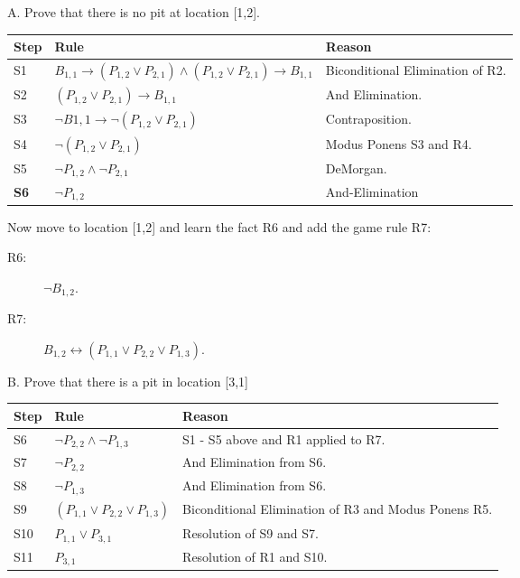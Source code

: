 \documentclass[]{article}
\begin{document}
A.  Prove that there is no pit at location [1,2].
\vspace{4mm}

{\tabulinesep=1.5mm
\begin{tabu}{| l | l | l |}
\hline
Step & Rule & Reason \\
\hline
S1 & $B_{1,1} \rightarrow (P_{1,2} \vee P_{2,1}) \wedge (P_{1,2} \vee P_{2,1}) \rightarrow B_{1,1}$ & Biconditional Elimination of R2. \\
S2 & $(P_{1,2} \vee P_{2,1}) \rightarrow B_{1,1}$ & And Elimination. \\
S3 & $\neg B{1,1} \rightarrow \neg(P_{1,2} \vee P_{2,1})$ & Contraposition. \\
S4 & $\neg(P_{1,2} \vee P_{2,1})$ & Modus Ponens S3 and R4. \\
S5 & $\neg P_{1,2} \wedge \neg P_{2,1}$ & DeMorgan. \\
\textbf{S6} & $\neg P_{1,2}$ & And-Elimination \\
\hline
\end{tabu}}

\vspace{4mm}
Now move to location [1,2] and learn the fact R6 and add the game rule R7: 
\begin{description}
\item[R6:] $\neg B_{1,2}$.
\item[R7:] $B_{1,2} \leftrightarrow (P_{1,1} \vee P_{2,2} \vee P_{1,3})$.
\end{description}

B.  Prove that there is a pit in location [3,1]
\vspace{4mm}

{\tabulinesep=1.5mm
\begin{tabu}{| l | l | l |}
\hline
Step & Rule & Reason \\
\hline
S6 & $\neg P_{2,2} \wedge \neg P_{1,3}$ & S1 - S5 above and R1 applied to R7. \\
S7 & $\neg P_{2,2}$ & And Elimination from S6. \\
S8 & $\neg P_{1,3}$ & And Elimination from S6. \\
S9 & $(P_{1,1} \vee P_{2,2} \vee P_{1,3})$ & Biconditional Elimination of R3 and Modus Ponens R5.\\
S10 & $P_{1,1} \vee P_{3,1}$ & Resolution of S9 and S7. \\
S11 & $P_{3,1}$ & Resolution of R1 and S10. \\
\hline
\end{tabu}}
\end{document}
